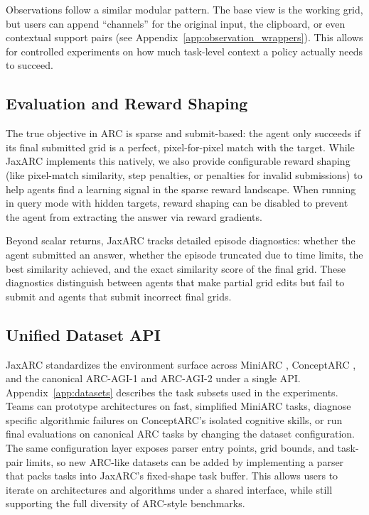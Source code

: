 Observations follow a similar modular pattern. The base view is the working grid, but users can append ``channels'' for the original input, the clipboard, or even contextual support pairs (see Appendix~\ref{app:observation_wrappers}). This allows for controlled experiments on how much task-level context a policy actually needs to succeed.

\subsection{Evaluation and Reward Shaping}

The true objective in ARC is sparse and submit-based: the agent only succeeds if its final submitted grid is a perfect, pixel-for-pixel match with the target. While JaxARC implements this natively, we also provide configurable reward shaping (like pixel-match similarity, step penalties, or penalties for invalid submissions) to help agents find a learning signal in the sparse reward landscape. When running in query mode with hidden targets, reward shaping can be disabled to prevent the agent from extracting the answer via reward gradients.

Beyond scalar returns, JaxARC tracks detailed episode diagnostics: whether the agent submitted an answer, whether the episode truncated due to time limits, the best similarity achieved, and the exact similarity score of the final grid. These diagnostics distinguish between agents that make partial grid edits but fail to submit and agents that submit incorrect final grids.

\subsection{Unified Dataset API}

JaxARC standardizes the environment surface across MiniARC \citep{kimPlaygroundsAbstractionReasoning2022}, ConceptARC \citep{moskvichevConceptARCBenchmarkEvaluating2023}, and the canonical ARC-AGI-1 \citep{cholletMeasureIntelligence2019} and ARC-AGI-2 \cite{cholletARCAGI2NewChallenge2025} under a single API. Appendix~\ref{app:datasets} describes the task subsets used in the experiments. Teams can prototype architectures on fast, simplified MiniARC tasks, diagnose specific algorithmic failures on ConceptARC's isolated cognitive skills, or run final evaluations on canonical ARC tasks by changing the dataset configuration. The same configuration layer exposes parser entry points, grid bounds, and task-pair limits, so new ARC-like datasets can be added by implementing a parser that packs tasks into JaxARC's fixed-shape task buffer. This allows users to iterate on architectures and algorithms under a shared interface, while still supporting the full diversity of ARC-style benchmarks.
